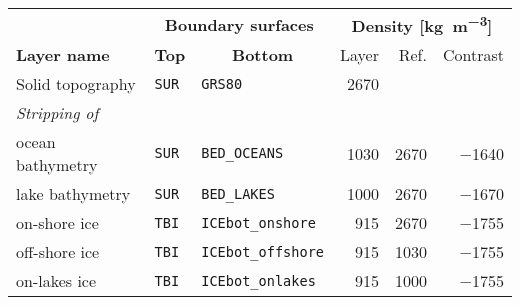 \begin{tabular}{lllrrr}
    \toprule   
    {} & \multicolumn{2}{c}{\textbf{Boundary surfaces}}  & \multicolumn{3}{c}{\textbf{Density [\si{\kilo \gram \per \cubic \metre}]}}\\
        \cmidrule{2-3}
        \cmidrule{4-6}
        \textbf{Layer name} & \multicolumn{1}{c}{\textbf{Top}} & \multicolumn{1}{c}{\textbf{Bottom}} & Layer & Ref. & Contrast \\
    \midrule
    Solid topography &
    \texttt{SUR} & \texttt{GRS80} &
    \num{2670} & & \\

    \textit{Stripping of} & & & & \\

    \quad ocean bathymetry &
    \texttt{SUR} & \texttt{BED\_OCEANS} &
    \num{1030} & \num{2670} & \num{-1640} \\

    \quad lake bathymetry &
    \texttt{SUR} & \texttt{BED\_LAKES} &
    \num{1000} & \num{2670} & \num{-1670} \\

    \quad on-shore ice &
    \texttt{TBI} & \texttt{ICEbot\_onshore} &
    \num{915} & \num{2670} & \num{-1755} \\

    \quad off-shore ice &
    \texttt{TBI} & \texttt{ICEbot\_offshore} &
    \num{915} & \num{1030} & \num{-1755} \\

    \quad on-lakes ice &
    \texttt{TBI} & \texttt{ICEbot\_onlakes} &
    \num{915} & \num{1000} & \num{-1755} \\
    \bottomrule
\end{tabular}